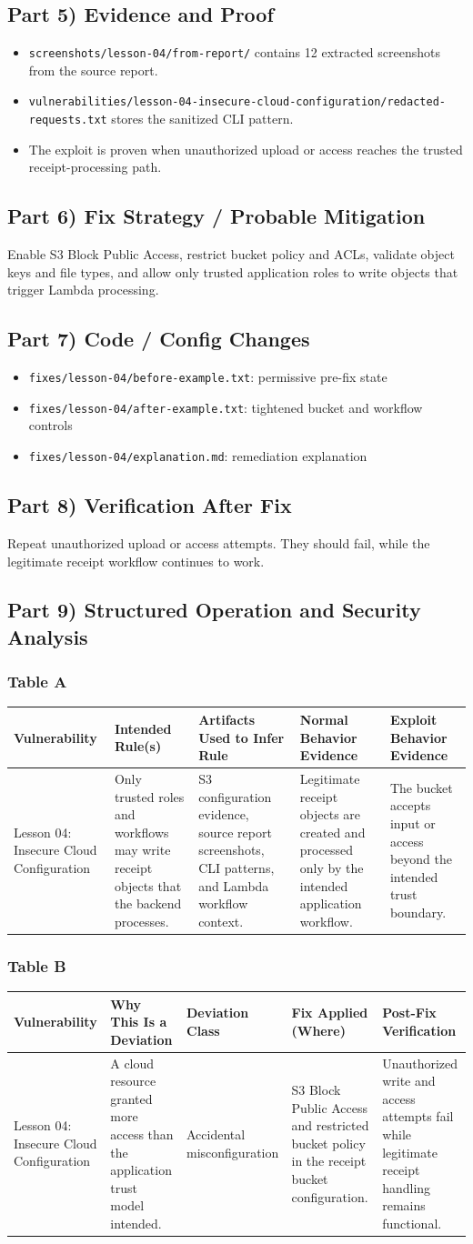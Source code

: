 \documentclass[12pt]{article}
\makeatletter
\newcommand{\analysistables}[9]{
\subsubsection*{Table A}
{\footnotesize
\begin{longtable}{@{}p{0.13\textwidth}p{0.18\textwidth}p{0.17\textwidth}p{0.16\textwidth}p{0.16\textwidth}@{}}
\toprule
Vulnerability & Intended Rule(s) & Artifacts Used to Infer Rule & Normal Behavior Evidence & Exploit Behavior Evidence \\
\midrule
#1 & #2 & #3 & #4 & #5 \\
\bottomrule
\end{longtable}
}

\subsubsection*{Table B}
{\footnotesize
\begin{longtable}{@{}p{0.13\textwidth}p{0.18\textwidth}p{0.13\textwidth}p{0.18\textwidth}p{0.16\textwidth}@{}}
\toprule
Vulnerability & Why This Is a Deviation & Deviation Class & Fix Applied (Where) & Post-Fix Verification \\
\midrule
#1 & #6 & #7 & #8 & #9 \\
\bottomrule
\end{longtable}
}
}
\makeatother
\begin{document}
\subsection*{Part 5) Evidence and Proof}
\begin{itemize}
\item \texttt{screenshots/lesson-04/from-report/} contains 12 extracted screenshots from the source report.
\item \texttt{vulnerabilities/lesson-04-insecure-cloud-configuration/redacted-requests.txt} stores the sanitized CLI pattern.
\item The exploit is proven when unauthorized upload or access reaches the trusted receipt-processing path.
\end{itemize}

\subsection*{Part 6) Fix Strategy / Probable Mitigation}
Enable S3 Block Public Access, restrict bucket policy and ACLs, validate object keys and file types, and allow only trusted application roles to write objects that trigger Lambda processing.

\subsection*{Part 7) Code / Config Changes}
\begin{itemize}
\item \texttt{fixes/lesson-04/before-example.txt}: permissive pre-fix state
\item \texttt{fixes/lesson-04/after-example.txt}: tightened bucket and workflow controls
\item \texttt{fixes/lesson-04/explanation.md}: remediation explanation
\end{itemize}

\subsection*{Part 8) Verification After Fix}
Repeat unauthorized upload or access attempts. They should fail, while the legitimate receipt workflow continues to work.

\subsection*{Part 9) Structured Operation and Security Analysis}
\analysistables
{Lesson 04: Insecure Cloud Configuration}
{Only trusted roles and workflows may write receipt objects that the backend processes.}
{S3 configuration evidence, source report screenshots, CLI patterns, and Lambda workflow context.}
{Legitimate receipt objects are created and processed only by the intended application workflow.}
{The bucket accepts input or access beyond the intended trust boundary.}
{A cloud resource granted more access than the application trust model intended.}
{Accidental misconfiguration}
{S3 Block Public Access and restricted bucket policy in the receipt bucket configuration.}
{Unauthorized write and access attempts fail while legitimate receipt handling remains functional.}
\end{document}
